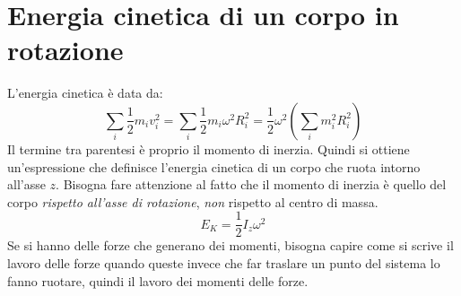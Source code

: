 \documentclass[10pt,a4paper]{book}
\begin{document}
\section{Energia cinetica di un corpo in rotazione}

L'energia cinetica è data da:
\[
	\sum_i \frac{1}{2} m_i v_i^2 = \sum_i \frac{1}{2} m_i\omega^2 R_i^2  = \frac{1}{2} \omega^2 \left( \sum_i m_i^2 R_i^2 \right)
\]
Il termine tra parentesi è proprio il momento di inerzia. Quindi si ottiene un'espressione che definisce l'energia cinetica di un corpo che ruota intorno all'asse $z$. Bisogna fare attenzione al fatto che il momento di inerzia è quello del corpo \emph{rispetto all'asse di rotazione}, \emph{non} rispetto al centro di massa.
\[
	E_K=\frac{1}{2} I_z\omega^2
\]
Se si hanno delle forze che generano dei momenti, bisogna capire come si scrive il lavoro delle forze quando queste invece che far traslare un punto del sistema lo fanno ruotare, quindi il lavoro dei momenti delle forze.
\end{document}
